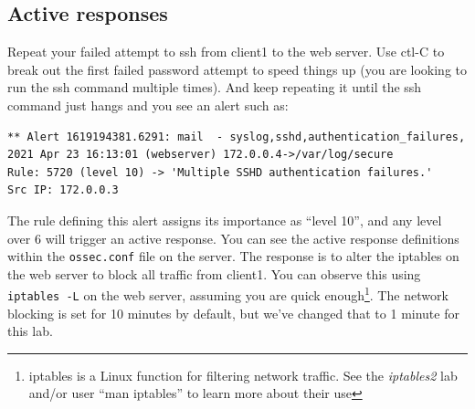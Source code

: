 \subsection{Active responses}
Repeat your failed attempt to ssh from client1 to the web server.  Use ctl-C to break out the first failed password
attempt to speed things up (you are looking to run the ssh command multiple times).  
And keep repeating it until the ssh command just hangs and you see an alert such as:
\begin{verbatim}
** Alert 1619194381.6291: mail  - syslog,sshd,authentication_failures,
2021 Apr 23 16:13:01 (webserver) 172.0.0.4->/var/log/secure
Rule: 5720 (level 10) -> 'Multiple SSHD authentication failures.'
Src IP: 172.0.0.3
\end{verbatim}
\noindent The rule defining this alert assigns its importance as ``level 10'', 
and any level over 6 will trigger an active response.
You can see the active response definitions within the {\tt ossec.conf} file on the server.  The response is to alter the
iptables on the web server to block all traffic from client1.  You can observe this using {\tt iptables -L} on the web server,
assuming you are quick enough\footnote{iptables is a Linux function for filtering network traffic.  See the \textit{iptables2} 
lab and/or user ``man iptables'' to learn more about their use}.
The network blocking is set for 10 minutes by default, but we've changed that to 1 minute for this lab.  

